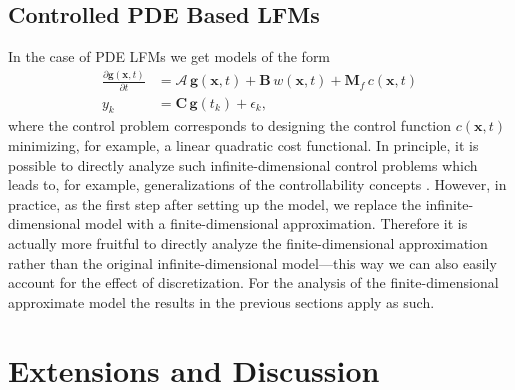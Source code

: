 \documentclass[journal]{IEEEtran}
\newcommand{\simo}[1]{{\color{red}#1}}
\begin{document}
\subsection{Controlled PDE Based LFMs}
%
In the case of PDE LFMs we get models of the form
%
\begin{equation}
\begin{split}
  \frac{\partial \mathbf{g}(\mathbf{x},t)}{\partial t}
  &= \mathbf{\mathcal{A}} \, \mathbf{g}(\mathbf{x},t)
  + \mathbf{B} \, w(\mathbf{x},t) + \mathbf{M}_f \, c(\mathbf{x},t) \\
  y_k &= \mathbf{C} \, \mathbf{g}(t_k) + \epsilon_k,
\end{split}
\end{equation}
%
where the control problem corresponds to designing the control function $c(\mathbf{x},t)$ minimizing, for example, a linear quadratic cost functional. In principle, it is possible to directly analyze such infinite-dimensional control problems which leads to, for example, generalizations of the controllability concepts \cite{Curtain:2012}. However, in practice, as the first step after setting up the model, we replace the infinite-dimensional model with a finite-dimensional approximation. Therefore it is actually more fruitful to directly analyze the finite-dimensional approximation rather than the original infinite-dimensional model---this way we can also easily account for the effect of discretization. For the analysis of the finite-dimensional approximate model the results in the previous sections apply as such.


\section{Extensions and Discussion}

%
%
%
\end{document}
